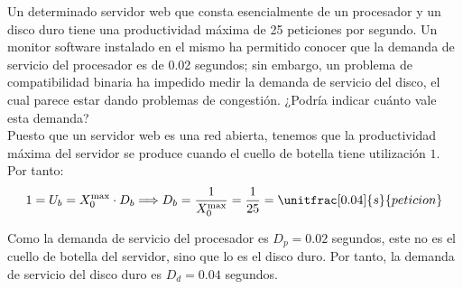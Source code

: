 \begin{ejercicio}\label{ej:5.9}
    Un determinado servidor web que consta esencialmente de un procesador y un disco duro tiene una productividad máxima de 25 peticiones por segundo. Un monitor software instalado en el mismo ha permitido conocer que la demanda de servicio del procesador es de 0.02 segundos; sin embargo, un problema de compatibilidad binaria ha impedido medir la demanda de servicio del disco, el cual parece estar dando problemas de congestión. ¿Podría indicar cuánto vale esta demanda?\\

    Puesto que un servidor web es una red abierta, tenemos que la productividad máxima del servidor se produce cuando el cuello de botella tiene utilización $1$. Por tanto:
    \begin{equation*}
        1 = U_b = X_0^{\text{max}} \cdot D_b
        \Longrightarrow D_b = \dfrac{1}{X_0^{\text{max}}} = \dfrac{1}{25} = \unitfrac[0.04]{s}{peticion}
    \end{equation*}

    Como la demanda de servicio del procesador es $D_p = 0.02$ segundos, este no es el cuello de botella del servidor, sino que lo es el disco duro. Por tanto, la demanda de servicio del disco duro es $D_d = 0.04$ segundos.
\end{ejercicio}
\begin{comment}
\solucion
    La demanda de servicio del disco es 0.04 segundos/petición por ser éste el cuello de botella.
\end{comment}

